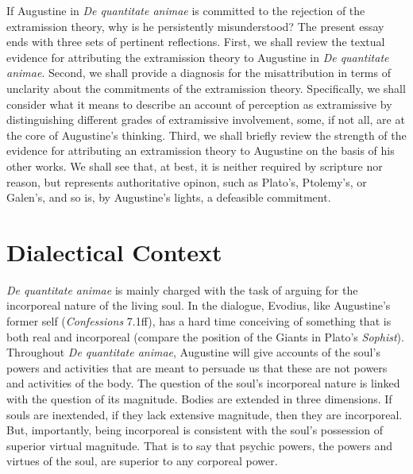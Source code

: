 \documentclass[12pt]{article}
\begin{document}
If Augustine in \emph{De quantitate animae} is committed to the rejection of the extramission theory, why is he persistently misunderstood? The present essay ends with three sets of pertinent reflections. First, we shall review the textual evidence for attributing the extramission theory to Augustine in \emph{De quantitate animae}. Second, we shall provide a diagnosis for the misattribution in terms of unclarity about the commitments of the extramission theory. Specifically, we shall consider what it means to describe an account of perception as extramissive by distinguishing different grades of extramissive involvement, some, if not all, are at the core of Augustine's thinking. Third, we shall briefly review the strength of the evidence for attributing an extramission theory to Augustine on the basis of his other works. We shall see that, at best, it is neither required by scripture nor reason, but represents authoritative opinon, such as Plato's, Ptolemy's, or Galen's, and so is, by Augustine's lights, a defeasible commitment.


\section{Dialectical Context} %
\label{sec:dialectical_context}


\emph{De quantitate animae}  is mainly charged with the task of arguing for the incorporeal nature of the living soul. In the dialogue, Evodius, like Augustine’s former self (\emph{Confessions} 7.1ff), has a hard time conceiving of something that is both real and incorporeal (compare the position of the Giants in Plato's \emph{Sophist}). Throughout \emph{De quantitate animae}, Augustine will give accounts of the soul’s powers and activities that are meant to persuade us that these are not powers and activities of the body. The question of the soul’s incorporeal nature is linked with the question of its magnitude. Bodies are extended in three dimensions. If souls are inextended, if they lack extensive magnitude, then they are incorporeal. But, importantly, being incorporeal is consistent with the soul’s possession of superior virtual magnitude. That is to say that psychic powers, the powers and virtues of the soul, are superior to any corporeal power. 
\end{document}
